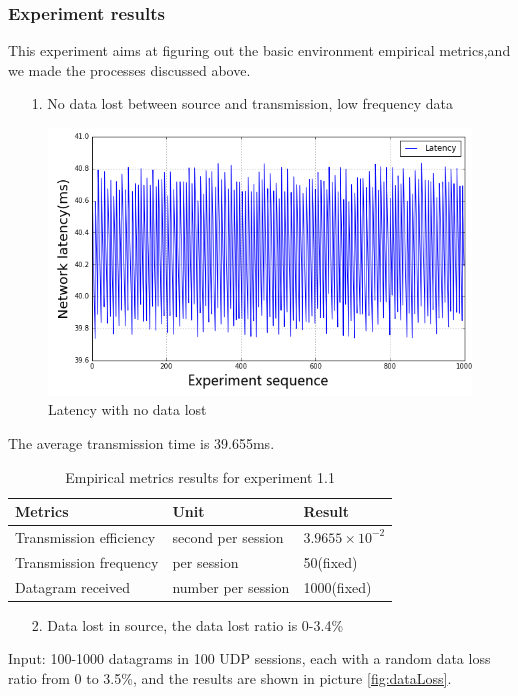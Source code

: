 \documentclass[11pt,openright,a4paper]{report}
\begin{document}
\subsubsection{Experiment results}
This experiment aims at figuring out the basic environment empirical metrics,and we made the processes discussed above.
\begin{itemize}
	\item[1.] No data lost between source and transmission, low frequency data
\end{itemize}
\begin{figure}[H]
\centering
\includegraphics[width=0.6\linewidth]{picture/experiments/exp1/latency}
\caption{Latency with no data lost}
\label{fig:latency}
\end{figure}
The average transmission time is 39.655ms. 
\begin{table}[H]
	\centering
	\caption{Empirical metrics results for experiment 1.1}
	\label{my-label}
	\begin{tabular}{@{}lll@{}}
		\toprule
		Metrics                 & Unit               & Result                 \\ \midrule
		Transmission efficiency & second per session & $3.9655\times 10^{-2}$ \\
		Transmission frequency  & per session        & 50(fixed)              \\
		Datagram received       & number per session & 1000(fixed)            \\ \bottomrule
	\end{tabular}
\end{table}
\begin{itemize}
	\item[2.] Data lost in source, the data lost ratio is 0-3.4\%
\end{itemize}
Input: 100-1000 datagrams in 100 UDP sessions, each with a random data loss ratio from 0 to 3.5\%, and the results are shown in picture \ref{fig:dataLoss}.\\
\end{document}
